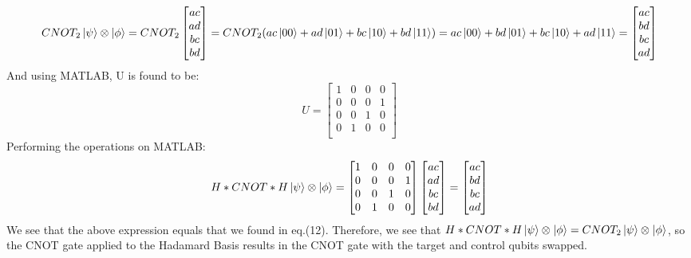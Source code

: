 \documentclass{article}
\newcommand{\tens}[1]{%
  \mathbin{\mathop{\otimes}\displaylimits_{#1}}%
}
\begin{document}
\begin{enumerate}
\begin{equation}
            CNOT_{2} \ket{\psi}\tens{}\ket{\phi} = CNOT_{2} \begin{bmatrix}
            ac\\ad\\bc\\bd
            \end{bmatrix} = CNOT_{2} (ac\ket{00}+ad\ket{01}+bc\ket{10}+bd\ket{11}) = ac\ket{00}+bd\ket{01}+bc\ket{10}+ad\ket{11} = \begin{bmatrix}
            ac\\bd\\bc\\ad
            \end{bmatrix}
        \end{equation}
        And using MATLAB, U is found to be:
        \begin{equation}
            U = 
            \begin{bmatrix}
            1 &    0  &   0    & 0\\
            0   & 0    & 0 &    1\\
            0    & 0   & 1   & 0\\
             0   & 1 &    0   &  0\\
            \end{bmatrix}
        \end{equation}
        Performing the operations on MATLAB:
        \begin{equation}
            H*CNOT*H \ket{\psi}\tens{}\ket{\phi} = \begin{bmatrix}
            1 &    0  &   0    & 0\\
            0   & 0    & 0 &    1\\
            0    & 0   & 1   & 0\\
             0   & 1 &    0   &  0\\
            \end{bmatrix} \begin{bmatrix}
            ac\\ad\\bc\\bd
            \end{bmatrix} = \begin{bmatrix}
            ac\\bd\\bc\\ad
            \end{bmatrix} 
        \end{equation}
        We see that the above expression equals that we found in eq.(12).
        Therefore, we see that $H*CNOT*H \ket{\psi}\tens{}\ket{\phi} = CNOT_{2} \ket{\psi}\tens{}\ket{\phi}$, so the CNOT gate applied to the Hadamard Basis results in the CNOT gate with the target and control qubits swapped.
    \end{enumerate}
\end{document}
